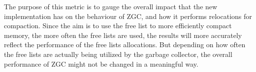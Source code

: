 The purpose of this metric is to gauge the overall impact that the new implementation has on the behaviour of ZGC, and how it performs relocations for compaction. Since the aim is to use the free list to more efficiently compact memory, the more often the free lists are used, the results will more accurately reflect the performance of the free lists allocations. But depending on how often the free lists are actually being utilized by the garbage collector, the overall performance of ZGC might not be changed in a meaningful way.

